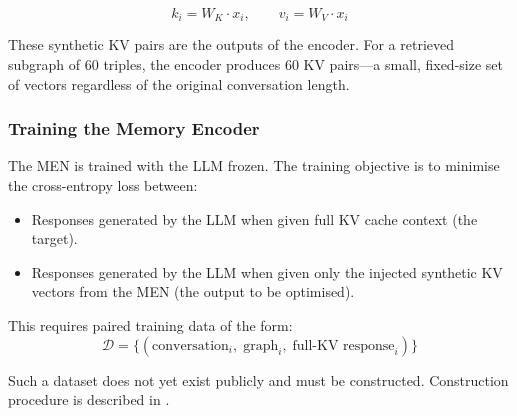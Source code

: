 \documentclass[11pt, a4paper, twoside]{article}
\theoremstyle{definition}
\begin{document}
\[
k_i = W_K \cdot x_i, \qquad v_i = W_V \cdot x_i
\]

These synthetic KV pairs are the outputs of the encoder. For a retrieved subgraph
of 60 triples, the encoder produces 60 KV pairs---a small, fixed-size set of vectors
regardless of the original conversation length.

\subsubsection{Training the Memory Encoder}

The MEN is trained with the LLM frozen. The training objective is to minimise the
cross-entropy loss between:
\begin{itemize}[leftmargin=*]
  \item Responses generated by the LLM when given full KV cache context (the target).
  \item Responses generated by the LLM when given only the injected synthetic KV
    vectors from the MEN (the output to be optimised).
\end{itemize}

This requires paired training data of the form:
\[
\mathcal{D} = \{(\text{conversation}_i,\;\text{graph}_i,\;\text{full-KV response}_i)\}
\]

Such a dataset does not yet exist publicly and must be constructed. Construction
procedure is described in .
\end{document}
